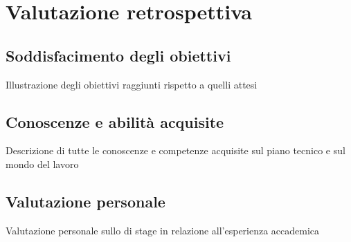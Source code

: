 
\chapter{Valutazione retrospettiva}
\label{cap:retrospettiva}

\section{Soddisfacimento degli obiettivi}
Illustrazione degli obiettivi raggiunti rispetto a quelli attesi
\section{Conoscenze e abilità acquisite}
Descrizione di tutte le conoscenze e competenze acquisite sul piano tecnico e sul mondo del lavoro
\section{Valutazione personale}
Valutazione personale sullo di stage in relazione all'esperienza accademica
